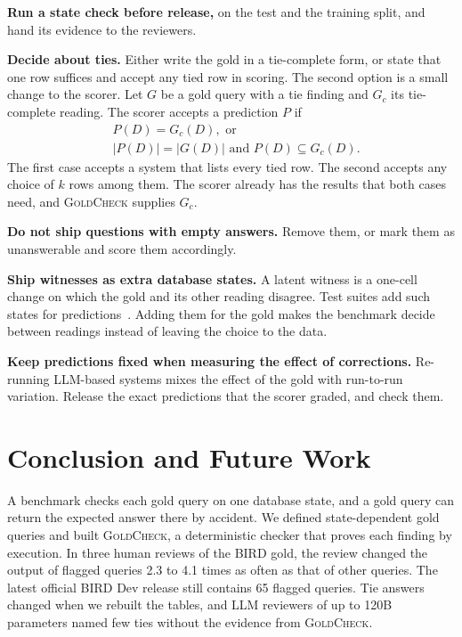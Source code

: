 \documentclass[conference]{IEEEtran}
\newcommand{\sys}{\textsc{GoldCheck}}
\begin{document}
\textbf{Run a state check before release,} on the test and the training
split, and hand its evidence to the reviewers.

\textbf{Decide about ties.} Either write the gold in a tie-complete form, or state
that one row suffices and accept any tied row in scoring. The second option is a
small change to the scorer. Let $G$ be a gold query with a tie finding and $G_c$
its tie-complete reading. The scorer accepts a prediction $P$ if
\begin{align*}
&P(D) = G_c(D), \text{ or}\\
&|P(D)| = |G(D)| \text{ and } P(D) \subseteq G_c(D).
\end{align*}
The first case accepts a system that lists every tied row. The second accepts any
choice of $k$ rows among them. The scorer already has the results that both
cases need, and \sys{} supplies $G_c$.

\textbf{Do not ship questions with empty answers.} Remove them, or mark them as
unanswerable and score them accordingly.

\textbf{Ship witnesses as extra database states.} A latent witness is a one-cell
change on which the gold and its other reading disagree. Test suites add such
states for predictions~\cite{zhong2020test}. Adding them for the gold makes the
benchmark decide between readings instead of leaving the choice to the data.

\textbf{Keep predictions fixed when measuring the effect of corrections.}
Re-running LLM-based systems mixes the effect of the gold with run-to-run
variation. Release the exact predictions that the scorer graded, and check them.

\section{Conclusion and Future Work}
A benchmark checks each gold query on one database state, and a gold query can
return the expected answer there by accident. We defined state-dependent gold
queries and built \sys{}, a deterministic checker that proves each finding by
execution. In three human reviews of the BIRD gold, the review changed the
output of flagged queries 2.3 to 4.1 times as often as that of other queries.
The latest official BIRD Dev release still contains 65 flagged queries. Tie
answers changed when we rebuilt the tables, and LLM reviewers of up to 120B
parameters named few ties without the evidence from \sys{}.
\end{document}
